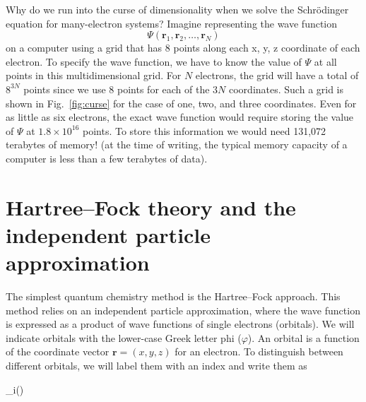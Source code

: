 \documentclass[../Main/notes.tex]{subfiles}
\begin{document}
Why do we run into the curse of dimensionality when we solve the Schr\"{o}dinger equation for many-electron systems?
Imagine representing the wave function
\begin{equation}
\Psi(\mathbf{r}_1, \mathbf{r}_2, \ldots, \mathbf{r}_N)
\end{equation}
on a computer using a grid that has 8 points along each x, y, z coordinate of each electron.
To specify the wave function, we have to know the value of $\Psi$ at all points in this multidimensional grid.
For $N$ electrons, the grid will have a total of $8^{3N}$ points since we use 8 points for each of the $3N$ coordinates.
Such a grid is shown in Fig.~\ref{fig:curse} for the case of one, two, and three coordinates.
Even for as little as six electrons, the exact wave function would require storing the value of $\Psi$ at $1.8 \times 10^{16}$ points. To store this information we would need 131,072 terabytes of memory! (at the time of writing, the typical memory capacity of a computer is less than a few terabytes of data).

\section{Hartree--Fock theory and the independent particle approximation}
The simplest quantum chemistry method is the Hartree--Fock approach.
This method relies on an independent particle approximation, where the wave function is expressed as a product of wave functions of single electrons (orbitals).
We will indicate orbitals with the lower-case Greek letter phi ($\varphi$).
An orbital is a function of the coordinate vector $\mathbf{r} = (x,y,z)$ for an electron.
To distinguish between different orbitals, we will label them with an index and write them as
\begin{iequation}
\varphi_i()
\end{iequation}
\end{document}
